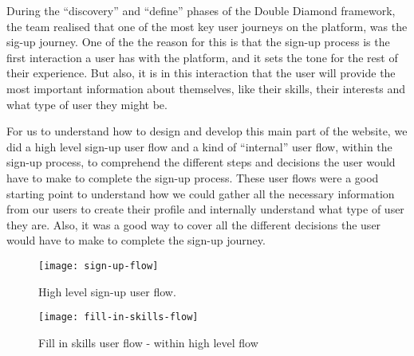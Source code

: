During the ``discovery'' and ``define'' phases of the Double Diamond framework, the team realised that one of the most key user journeys on the platform, was the sig-up journey.
One of the the reason for this is that the sign-up process is the first interaction a user has with the platform, and it sets the tone for the rest of their experience.
But also, it is in this interaction that the user will provide the most important information about themselves, like their skills, their interests and what type of user they might be.

For us to understand how to design and develop this main part of the website, we did a high level sign-up user flow and a kind of ``internal'' user flow, within the sign-up process, to comprehend the different steps and decisions the user would have to make to complete the sign-up process.
These user flows were a good starting point to understand how we could gather all the necessary information from our users to create their profile and internally understand what type of user they are.
Also, it was a good way to cover all the different decisions the user would have to make to complete the sign-up journey.
\begin{figure}[h]
    \centering
    \texttt{[image: sign-up-flow]}
    \caption{High level sign-up user flow.}\label{fig:figure5}
\end{figure}
\newpage
\begin{figure}[h]
    \centering
    \texttt{[image: fill-in-skills-flow]}
    \caption{Fill in skills user flow - within high level flow}\label{fig:figure6}
\end{figure}

